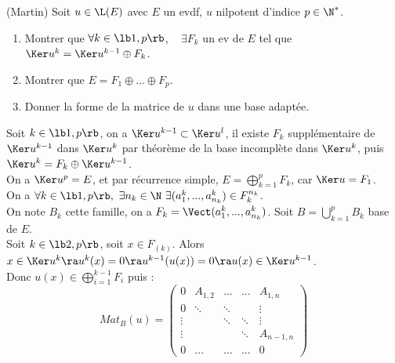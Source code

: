 \documentclass[11pt]{article}
\begin{document}
\begin{exercice}{(Martin)}{}
    Soit $u\in\L(E)$ avec $E$ un evdf, $u$ nilpotent d'indice $p\in\N^*$.
    \begin{enumerate}
        \item Montrer que $\forall k \in \lb1,p\rb$, ~ $\exists F_k$ un ev de $E$ tel que $\Ker u^k = \Ker u^{k-1}\oplus F_k$.
        \item Montrer que $E=F_1\oplus ... \oplus F_p$.
        \item Donner la forme de la matrice de $u$ dans une base adaptée.
    \end{enumerate} 
    \tcblower
     Soit $k\in\lb1,p\rb$, on a $\Ker u^{k-1} \subset \Ker u^l$, il existe $F_k$ supplémentaire de $\Ker u^{k-1}$ dans $\Ker u^k$ par théorème de la base incomplète dans $\Ker u^k$, puis $\Ker u^k = F_k \oplus \Ker u^{k-1}$.\\
     On a $\Ker u^p = E$, et par récurrence simple, $E=\bigoplus_{k=1}^pF_k$, car $\Ker u = F_1$.\\
     On a $\forall k \in \lb1,p\rb, ~ \exists n_k \in \N ~ \exists (a_1^k, ..., a_{n_k}^k)\in F_k^{n_k}$.\\
    On note $B_k$ cette famille, on a $F_k=\Vect(a_1^k, ..., a_{n_k}^k)$. Soit $B=\bigcup_{k=1}^p B_k$ base de $E$.\\
    Soit $k\in\lb2,p\rb$, soit $x\in F_(k)$. Alors $x\in \Ker u^k \ra u^k(x)=0\ra u^{k-1}(u(x))=0\ra u(x)\in\Ker u^{k-1}$.\\
    Donc $u(x)\in\bigoplus_{i=1}^{k-1}F_i$ puis :
    \begin{equation*}
        Mat_B(u) = \begin{pmatrix}
            0 & A_{1,2} & ... & ... & A_{1,n} \\
            0 & \ddots & \ddots & & \vdots \\
            \vdots & & \ddots & \ddots & \vdots \\
            \vdots & & & \ddots & A_{n-1,n} \\
            0 & ... & ... & ... & 0
        \end{pmatrix}
    \end{equation*}
\end{exercice}
\end{document}
